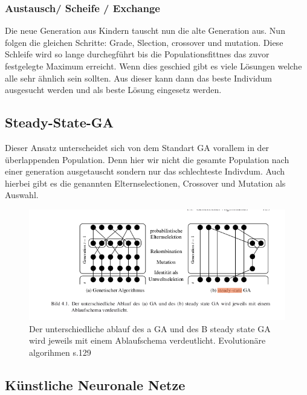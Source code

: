 \subsubsection{Austausch/ Scheife / Exchange}
Die neue Generation aus Kindern tauscht nun die alte Generation aus. Nun folgen die gleichen Schritte: Grade, Slection, crossover und mutation. 
Diese Schleife wird so lange durchegführt bis die Populationsfittnes das zuvor festgelegte Maximum erreicht. Wenn dies geschied gibt es viele Lösungen welche alle sehr ähnlich sein sollten. Aus dieser kann dann das beste Individum ausgesucht werden und als beste Lösung eingesetz werden. 

\subsection{Steady-State-GA} \label{Steady-State-GA}
Dieser Ansatz unterscheidet sich von dem Standart GA vorallem in der überlappenden Population. Denn hier wir nicht die gesamte Population nach einer generation ausgetauscht sondern nur das schlechteste Indivdum. Auch hierbei gibt es die genannten Elternselectionen, Crossover und Mutation als Auswahl. 
\noindent%
\begin{figure}[H]
  \centering  
  \includegraphics[scale=0.5]{img/gavssteady-state.png}
  \caption{Der unterschiedliche ablauf des a GA und des B steady state GA wird jeweils mit einem Ablaufschema verdeutlicht. Evolutionäre algorihmen s.129 }
  \label{fig:chromosome}
\end{figure}

\newpage

\subsection{Künstliche Neuronale Netze}

